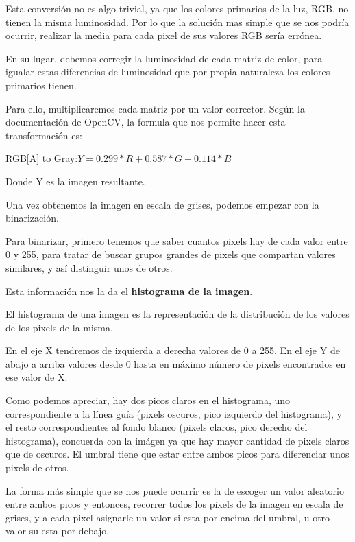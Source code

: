 Esta conversión no es algo trivial, ya que los colores primarios de la luz, RGB, no tienen la misma luminosidad. Por lo que la solución mas simple que se nos podría ocurrir, realizar la media para cada pixel de sus valores RGB sería errónea.

En su lugar, debemos corregir la luminosidad de cada matriz de color, para igualar estas diferencias de luminosidad que por propia naturaleza los colores primarios tienen. 

Para ello, multiplicaremos cada matriz por un valor corrector.
Según la documentación de OpenCV\cite{OpenCVRGBGRAY}, la formula que nos permite hacer esta transformación es:

RGB[A] to Gray:$Y=0.299*R+0.587*G+0.114*B$

Donde Y es la imagen resultante.

Una vez obtenemos la imagen en escala de grises, podemos empezar con la binarización.

Para binarizar, primero tenemos que saber cuantos pixels hay de cada valor entre 0 y 255, para tratar de buscar grupos grandes de pixels que compartan valores similares, y así distinguir unos de otros. 

Esta información nos la da el \textbf{histograma de la imagen}.

El histograma de una imagen es la representación de la distribución de los valores de los pixels de la misma.

En el eje X tendremos de izquierda a derecha valores de 0 a 255. En el eje Y de abajo a arriba valores desde 0 hasta en máximo número de pixels encontrados en ese valor de X.


Como podemos apreciar, hay dos picos claros en el histograma, uno correspondiente a la línea guía (pixels oscuros, pico izquierdo del histograma), y el resto correspondientes al fondo blanco (pixels claros, pico derecho del histograma), concuerda con la imágen ya que hay mayor cantidad de pixels claros que de oscuros. El umbral tiene que estar entre ambos picos para diferenciar unos pixels de otros.

La forma más simple que se nos puede ocurrir es la de escoger un valor aleatorio entre ambos picos y entonces, recorrer todos los pixels de la imagen en escala de grises, y a cada pixel asignarle un valor si esta por encima del umbral, u otro valor su esta por debajo.

